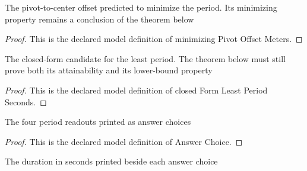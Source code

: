 \begin{definition}
  \label{def:physics:phyx-mini-0266:phyxminiproblems-problemphyxmini0266-minimizingpivotoffsetmeters}
  The pivot-to-center offset predicted to minimize the period. Its minimizing property remains a conclusion of the theorem below
\end{definition}
\begin{proof}
  This is the declared model definition of minimizing Pivot Offset Meters.
\end{proof}
\begin{definition}
  \label{def:physics:phyx-mini-0266:phyxminiproblems-problemphyxmini0266-closedformleastperiodseconds}
  The closed-form candidate for the least period. The theorem below must still prove both its attainability and its lower-bound property
\end{definition}
\begin{proof}
  This is the declared model definition of closed Form Least Period Seconds.
\end{proof}
\begin{definition}
  \label{def:physics:phyx-mini-0266:phyxminiproblems-problemphyxmini0266-answerchoice}
  The four period readouts printed as answer choices
\end{definition}
\begin{proof}
  This is the declared model definition of Answer Choice.
\end{proof}
\begin{definition}
  \label{def:physics:phyx-mini-0266:phyxminiproblems-problemphyxmini0266-answerperiodseconds}
  The duration in seconds printed beside each answer choice
\end{definition}
